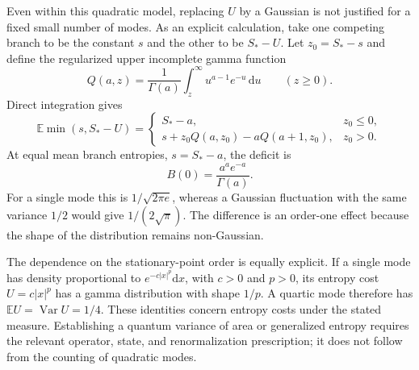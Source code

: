 \documentclass[11pt,letterpaper]{article}
\newcommand{\E}{\mathbb{E}}
\DeclareMathOperator{\Var}{Var}
\newcommand{\dd}{\mathrm{d}}
\theoremstyle{plain}
\theoremstyle{definition}
\theoremstyle{remark}
\begin{document}
Even within this quadratic model, replacing $U$ by a Gaussian is not justified for a fixed small number of modes. As an explicit calculation, take one competing branch to be the constant $s$ and the other to be $S_*-U$. Let $z_0=S_*-s$ and define the regularized upper incomplete gamma function
\begin{equation}
 Q(a,z)=\frac{1}{\Gamma(a)}\int_z^\infty u^{a-1}e^{-u}\,\dd u
 \qquad (z\geq0).
 \label{eq09:upper_gamma}
\end{equation}
Direct integration gives
\begin{equation}
 \E\min(s,S_*-U)=
 \begin{cases}
 S_*-a, & z_0\leq0,\\[2pt]
 s+z_0Q(a,z_0)-aQ(a+1,z_0), & z_0>0.
 \end{cases}
 \label{eq09:gamma_minimum}
\end{equation}
At equal mean branch entropies, $s=S_*-a$, the deficit is
\begin{equation}
 B(0)=\frac{a^a e^{-a}}{\Gamma(a)}.
 \label{eq09:gamma_central_deficit}
\end{equation}
For a single mode this is $1/\sqrt{2\pi e}$, whereas a Gaussian fluctuation with the same variance $1/2$ would give $1/(2\sqrt\pi)$. The difference is an order-one effect because the shape of the distribution remains non-Gaussian.

The dependence on the stationary-point order is equally explicit. If a single mode has density proportional to $e^{-c|x|^p}\dd x$, with $c>0$ and $p>0$, its entropy cost $U=c|x|^p$ has a gamma distribution with shape $1/p$. A quartic mode therefore has $\E U=\Var U=1/4$. These identities concern entropy costs under the stated measure. Establishing a quantum variance of area or generalized entropy requires the relevant operator, state, and renormalization prescription; it does not follow from the counting of quadratic modes.
\end{document}
